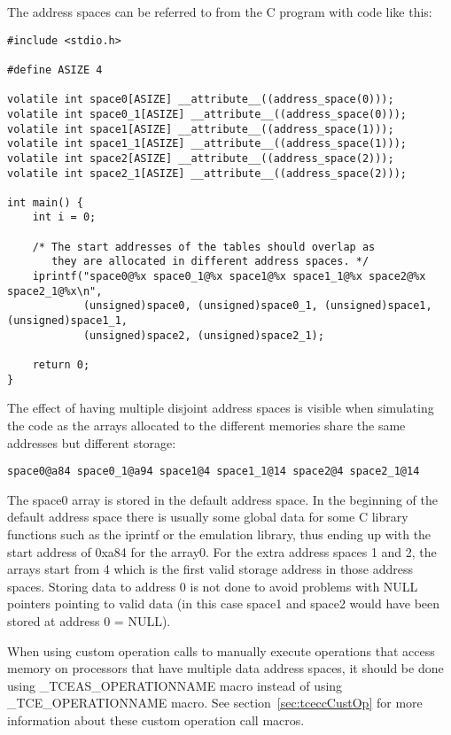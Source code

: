 \documentclass[twoside]{tceusermanual}
\begin{document}
The address spaces can be referred to from the C program with code
like this:

\begin{verbatim}
#include <stdio.h>

#define ASIZE 4

volatile int space0[ASIZE] __attribute__((address_space(0)));
volatile int space0_1[ASIZE] __attribute__((address_space(0)));
volatile int space1[ASIZE] __attribute__((address_space(1)));
volatile int space1_1[ASIZE] __attribute__((address_space(1)));
volatile int space2[ASIZE] __attribute__((address_space(2)));
volatile int space2_1[ASIZE] __attribute__((address_space(2)));

int main() {
    int i = 0;

    /* The start addresses of the tables should overlap as
       they are allocated in different address spaces. */
    iprintf("space0@%x space0_1@%x space1@%x space1_1@%x space2@%x space2_1@%x\n",
            (unsigned)space0, (unsigned)space0_1, (unsigned)space1, (unsigned)space1_1,
            (unsigned)space2, (unsigned)space2_1);

    return 0;
}
\end{verbatim}

The effect of having multiple disjoint address spaces is visible when 
simulating the code as the arrays allocated to the different memories share 
the same addresses but different storage:

\begin{verbatim}
space0@a84 space0_1@a94 space1@4 space1_1@14 space2@4 space2_1@14
\end{verbatim}

The space0 array is stored in the default address space. In the beginning
of the default address space there is usually some global data for 
some C library functions
such as the iprintf or the emulation library, thus ending up with the
start address of 0xa84 for the array0. For the extra address spaces
1 and 2, the arrays start from 4 which is the first valid storage address in
those address spaces. Storing data to address 0 is not done to avoid 
problems with NULL pointers pointing to valid data (in this case space1 and
space2 would have been stored at address 0 = NULL).

When using custom operation calls to manually execute operations that access
memory on processors that have multiple data address spaces,
it should be done using \_TCEAS\_OPERATIONNAME macro instead of using
\_TCE\_OPERATIONNAME macro. See section~\ref{sec:tceccCustOp}
 for more information about these custom operation call macros.
\end{document}
